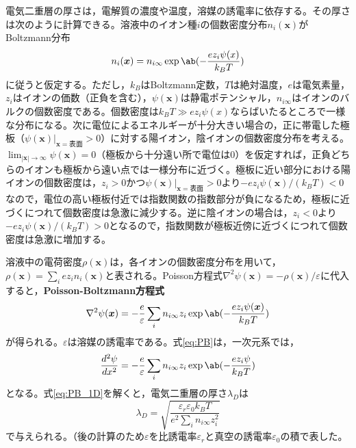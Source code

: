 \documentclass[autodetect-engine,dvi=dvipdfmx,a4paper,ja=standard,oneside,openany,11pt]{bxjsbook}
\begin{document}
電気二重層の厚さは，電解質の濃度や温度，溶媒の誘電率に依存する。その厚さは次のように計算できる\cite{足立泰久2013電気二重層とコロイド分散系の凝集}。溶液中のイオン種$i$の個数密度分布$n_i(\bm{x})$がBoltzmann分布
\begin{equation}
  n_i(\bm{x}) = n_{i\infty}\exp\ab(-\frac{ez_i\psi(x)}{k_BT})
  \label{eq:boltzmann}
\end{equation}
に従うと仮定する。ただし，$k_B$はBoltzmann定数，$T$は絶対温度，$e$は電気素量，$z_i$はイオンの価数（正負を含む），$\psi(\bm{x})$は静電ポテンシャル，$n_{i\infty}$はイオンのバルクの個数密度である。個数密度は$k_B T\gg ez_i\psi(x)$ならばいたるところで一様な分布になる。次に電位によるエネルギーが十分大きい場合の，正に帯電した極板（$\psi(\bm{x})|_{\bm{x}=\mathrm{表面}}>0$）に対する陽イオン，陰イオンの個数密度分布を考える。$\lim_{|\bm{x}|\to\infty}\psi(\bm{x})=0$（極板から十分遠い所で電位は0）を仮定すれば，正負どちらのイオンも極板から遠い点では一様分布に近づく。極板に近い部分における陽イオンの個数密度は，$z_i>0$かつ$\psi(\bm{x})|_{\bm{x}=\mathrm{表面}}>0$より$-ez_i\psi(\bm{x})/(k_BT)<0$なので，電位の高い極板付近では指数関数の指数部分が負になるため，極板に近づくにつれて個数密度は急激に減少する。逆に陰イオンの場合は，$z_i<0$より$-ez_i\psi(\bm{x})/(k_BT)>0$となるので，指数関数が極板近傍に近づくにつれて個数密度は急激に増加する。

溶液中の電荷密度$\rho(\bm{x})$は，各イオンの個数密度分布を用いて，$\rho(\bm{x})=\sum_{i}ez_in_i(\bm{x})$と表される。Poisson方程式$\nabla^2\psi(\bm{x})=-\rho(\bm{x})/\varepsilon$に代入すると，\textbf{Poisson-Boltzmann方程式}
\begin{equation}
  \nabla^2\psi(\bm{x}) = -\frac{e}{\varepsilon}\sum_{i}n_{i\infty}z_i\exp\ab(-\frac{ez_i\psi(\bm{x})}{k_BT})
  \label{eq:PB}
\end{equation}
が得られる。$\varepsilon$は溶媒の誘電率である。式\eqref{eq:PB}は，一次元系では，
\begin{equation}
  \frac{d^2\psi}{dx^2} = -\frac{e}{\varepsilon}\sum_{i}n_{i\infty}z_i\exp\ab(-\frac{ez_i\psi}{k_BT})
  \label{eq:PB_1D}
\end{equation}
となる。式\eqref{eq:PB_1D}を解くと，電気二重層の厚さ$\lambda_D$は
\begin{equation}
  \lambda_D = \sqrt{\frac{\varepsilon_r\varepsilon_0 k_BT}{e^2\sum_{i}n_{i\infty}z_i^2}}\label{eq:debye_length}
\end{equation}
で与えられる。（後の計算のため$\varepsilon$を比誘電率$\varepsilon_r$と真空の誘電率$\varepsilon_0$の積で表した。%
\end{document}
